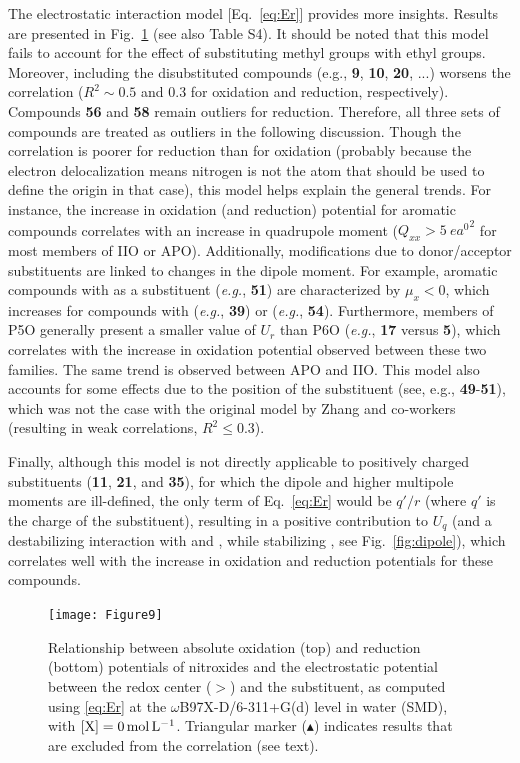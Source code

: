 \documentclass[review,preprint]{elsarticle}
\begin{document}
The electrostatic interaction model [Eq.~\eqref{eq:Er}] provides more insights. Results are presented in Fig.~\ref{fig:corr} (see also Table S4). It should be noted that this model fails to account for the effect of substituting methyl groups with ethyl groups. Moreover, including the disubstituted compounds (e.g., \textbf{9}, \textbf{10}, \textbf{20}, ...) worsens the correlation ($R^2 \sim 0.5$ and 0.3 for oxidation and reduction, respectively). Compounds \textbf{56} and \textbf{58} remain outliers for reduction. Therefore, all three sets of compounds are treated as outliers in the following discussion.
Though the correlation is poorer for reduction than for oxidation (probably because the electron delocalization means nitrogen is not the atom that should be used to define the origin in that case), this model helps explain the general trends. For instance, the increase in oxidation (and reduction) potential for aromatic compounds correlates with an increase in quadrupole moment ($Q_{xx} > \SI{5}{\elementarycharge\bohr\squared}$ for most members of IIO or APO). Additionally, modifications due to donor/acceptor substituents are linked to changes in the dipole moment. For example, aromatic compounds with  as a substituent (\textit{e.g.}, \textbf{51}) are characterized by $\mu_{x} < 0$, which increases for compounds with  (\textit{e.g.}, \textbf{39}) or  (\textit{e.g.}, \textbf{54}). Furthermore, members of P5O generally present a smaller value of $U_r$ than P6O (\textit{e.g.}, \textbf{17} versus \textbf{5}), which correlates with the increase in oxidation potential observed between these two families. The same trend is observed between APO and IIO.
This model also accounts for some effects due to the position of the substituent (see, e.g., \textbf{49}-\textbf{51}), which was not the case with the original model by Zhang and co-workers (resulting in weak correlations, $R^2 \leq 0.3$). 

Finally, although this model is not directly applicable to positively charged substituents (\textbf{11}, \textbf{21}, and \textbf{35}), for which the dipole and higher multipole moments are ill-defined, the only term of Eq.~\eqref{eq:Er}  would be $q'/r$ (where $q'$ is the charge of the substituent), resulting in a positive contribution to $U_q$ (and a destabilizing interaction with  and , while stabilizing , see Fig.~\ref{fig:dipole}), which correlates well with the increase in oxidation and reduction potentials for these compounds.


\begin{figure}[!h]
\centering
\texttt{[image: Figure9]}
\caption{Relationship between absolute oxidation (top) and reduction (bottom) potentials of nitroxides and the electrostatic potential between the redox center ($>$) and the substituent, as computed using \eqref{eq:Er} at the $\omega$B97X-D/6-311+G(d) level in water (SMD), with $[\ce{X}]=\SI{0}{\mole\per\liter}$. Triangular marker ($\blacktriangle$) indicates results that are excluded from the correlation (see text).}
\label{fig:corr} 
\end{figure}
\end{document}
